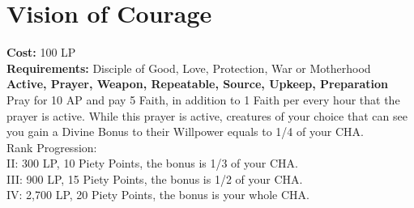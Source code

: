 \section{Vision of Courage}\label{prayer:courage}
\textbf{Cost:} 100 LP\\
\textbf{Requirements:} Disciple of Good, Love, Protection, War or Motherhood\\
\textbf{Active, Prayer, Weapon, Repeatable, Source, Upkeep, Preparation}\\
Pray for 10 AP and pay 5 Faith, in addition to 1 Faith per every hour that the prayer is active.
While this prayer is active, creatures of your choice that can see you gain a Divine Bonus to their Willpower equals to 1/4 of your CHA.
\\
Rank Progression:\\
II: 300 LP, 10 Piety Points, the bonus is 1/3 of your CHA.\\
III: 900 LP, 15 Piety Points, the bonus is 1/2 of your CHA.\\
IV: 2,700 LP, 20 Piety Points, the bonus is your whole CHA.\\